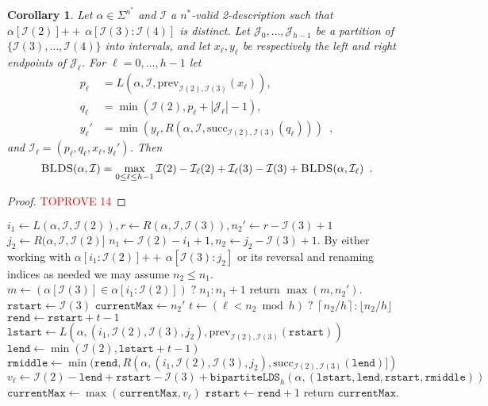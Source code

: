 \documentclass[12pt]{article}
\newcommand{\floor}[1]{\lfloor #1 \rfloor}
\newcommand{\ceil}[1]{\left\lceil #1 \right\rceil}
\newcommand{\concat}{\ensuremath{+\!\!\!\!+\,}}
\newcommand{\Iset}{\mathcal{I}}
\newcommand{\Jset}{\mathcal{J}}
\newcommand{\blds}{\textsc{BLDS}}
\newcommand{\prev}{\mathrm{prev}}
\newcommand{\suc}{\mathrm{succ}}
\newcommand{\rstart}{\texttt{rstart}}
\newcommand{\rend}{\texttt{rend}}
\newcommand{\rmiddle}{\texttt{rmiddle}}
\newcommand{\lstart}{\texttt{lstart}}
\newcommand{\lend}{\texttt{lend}}
\newcommand{\currentmax}{\texttt{currentMax}}
\newcommand{\upto}{\mathbin{:}}
\newtheorem{corollary}[theorem]{Corollary}
\theoremstyle{definition}
\begin{document}
\begin{corollary}
\label{cor:h}
Let $\alpha \in \Sigma^{n^*}$ and $\Iset$ a $n^*$-valid 2-description such that $\alpha[\Iset(2)] \concat \alpha[\Iset(3) \upto \Iset(4)]$ is distinct.
Let $\Jset_0, \ldots, \Jset_{h-1}$ be a partition of $\{\Iset(3), \ldots, \Iset(4)\}$ into intervals, and let $x_\ell, y_\ell$ be respectively the left and right endpoints of $\Jset_\ell$.    For $\ell = 0, \ldots, h-1$ let 
\begin{align*}
p_\ell &= L(\alpha, \Iset, \prev_{\Iset(2), \Iset(3)}(x_\ell)), \\
q_\ell &= \min(\Iset(2), p_\ell+|\Jset_\ell|-1), \\
y_\ell'&= \min(y_\ell, R(\alpha, \Iset, \suc_{\Iset(2), \Iset(3)}(q_\ell))) \enspace,
\end{align*}
and $\Iset_\ell = (p_\ell, q_\ell, x_\ell, y_\ell')$.
Then
\[
\blds(\alpha, \Iset) = \max_{0 \le \ell \le h-1} 
\Iset(2) - \Iset_\ell(2) + \Iset_\ell(3) - \Iset(3) + \blds(\alpha, \Iset_\ell) \enspace .
\]
\end{corollary}

\begin{proof}\textcolor{red}{TOPROVE 14}\end{proof}

\begin{algorithm}[!htbp]
\caption{$\texttt{bipartiteLDS}_h(\alpha, \Iset)$}
\label{alg:blds}
\begin{algorithmic}[1]
  \State $i_1 \gets L(\alpha, \Iset, \Iset(2)), r \gets R(\alpha, \Iset, \Iset(3)), 
    n_2' \gets r - \Iset(3) + 1$ \label{alg:line_one}
  \State $j_2 \gets R(\alpha, \Iset, \Iset(2)]$ \label{alg:line_two}
  \State $n_1 \gets \Iset(2) - i_1 + 1, n_2 \gets j_2 - \Iset(3) + 1$. By either working 
  with $\alpha[i_1 \upto \Iset(2)] \concat \alpha[\Iset(3) \upto j_2]$ or its reversal and renaming 
  indices as needed we may assume $n_2 \le n_1$.
  \label{alg:base_case}
    \State $m \gets  (\alpha[\Iset(3)] \in \alpha[i_1 \colon \Iset(2)]) \; ? \; n_1 \upto n_1 + 1$
    \State return $\max(m, n_2')$. \label{alg:return1}
  \EndIf
  \State $\rstart \gets \Iset(3)$
  \State $\currentmax \gets n_2'$
    \State $t \gets (\ell < n_2 \bmod h) \; ? \; \ceil{n_2/h} \upto \floor{n_2/h}$
    \State $\rend \gets \rstart + t - 1$
    \State $\lstart \gets L(\alpha, (i_1, \Iset(2), \Iset(3), j_2), \prev_{\Iset(2), \Iset(3)}(\rstart))$
    \State $\lend \gets \min(\Iset(2), \lstart + t - 1)$
    \State $\rmiddle \gets \min(\rend, R(\alpha, (i_1, \Iset(2), \Iset(3), j_2), \suc_{\Iset(2), \Iset(3)}(\lend)])$
    \State $v_\ell \gets \Iset(2) - \lend + \rstart - \Iset(3) + \texttt{bipartiteLDS}_h(\alpha, 
(\lstart, \lend, \rstart, \rmiddle))$
    \State $\currentmax \gets \max(\currentmax, v_\ell)$
    \State $\rstart \gets \rend + 1$
  \EndFor
  \State return $\currentmax$. \label{alg:return2}
\end{algorithmic}
\end{algorithm}
\end{document}
